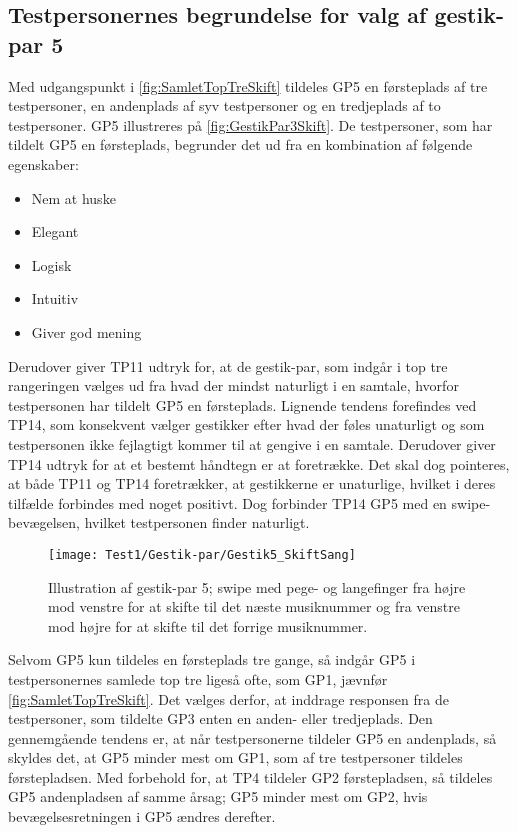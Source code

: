 \subsection{Testpersonernes begrundelse for valg af gestik-par 5}
\label{TestresultaterValgAfGestikkerBegrundelseGP5Skift}
%
Med udgangspunkt i \autoref{fig:SamletTopTreSkift} tildeles GP5 en førsteplads af tre testpersoner, en andenplads af syv testpersoner og en tredjeplads af to testpersoner. GP5 illustreres på \autoref{fig:GestikPar3Skift}. De testpersoner, som har tildelt GP5 en førsteplads, begrunder det ud fra en kombination af følgende egenskaber: 
%
\begin{multicols}{3}
    \begin{itemize}
        \item Nem at huske
        \item Elegant
        \item Logisk
        \item Intuitiv
        \item Giver god mening
\end{itemize}
\end{multicols}
\noindent
%
Derudover giver TP11 udtryk for, at de gestik-par, som indgår i top tre rangeringen vælges ud fra hvad der mindst naturligt i en samtale, hvorfor testpersonen har tildelt GP5 en førsteplads. Lignende tendens forefindes ved TP14, som konsekvent vælger gestikker efter hvad der føles unaturligt og som testpersonen ikke fejlagtigt kommer til at gengive i en samtale. Derudover giver TP14 udtryk for at et bestemt håndtegn er at foretrække. Det skal dog pointeres, at både TP11 og TP14 foretrækker, at gestikkerne er unaturlige, hvilket i deres tilfælde forbindes med noget positivt. Dog forbinder TP14 GP5 med en swipe-bevægelsen, hvilket testpersonen finder naturligt.  
%
\begin{figure}[H]
	\centering
	\texttt{[image: Test1/Gestik-par/Gestik5\_SkiftSang]}
	\caption{Illustration af gestik-par 5; swipe med pege- og langefinger fra højre mod venstre for at skifte til det næste musiknummer og fra venstre mod højre for at skifte til det forrige musiknummer.}
	\label{fig:GestikPar5Skift}
\end{figure}
\noindent
%
Selvom GP5 kun tildeles en førsteplads tre gange, så indgår GP5 i testpersonernes samlede top tre ligeså ofte, som GP1, jævnfør \autoref{fig:SamletTopTreSkift}. Det vælges derfor, at inddrage responsen fra de testpersoner, som tildelte GP3 enten en anden- eller tredjeplads.\blankline
%
Den gennemgående tendens er, at når testpersonerne tildeler GP5 en andenplads, så skyldes det, at GP5 minder mest om GP1, som af tre testpersoner tildeles førstepladsen. Med forbehold for, at TP4 tildeler GP2 førstepladsen, så tildeles GP5 andenpladsen af samme årsag; GP5 minder mest om GP2, hvis bevægelsesretningen i GP5 ændres derefter. 

